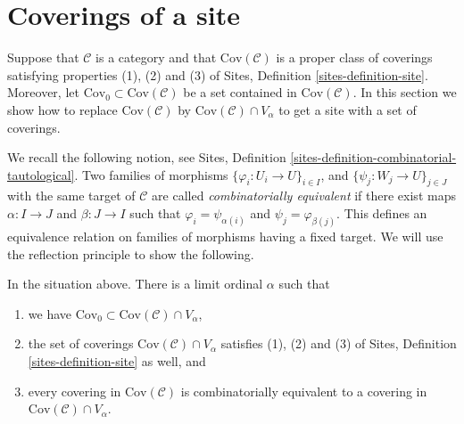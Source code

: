 \section{Coverings of a site}
\label{section-coverings-site}

\noindent
Suppose that $\mathcal{C}$ is a category and
that $\text{Cov}(\mathcal{C})$ is a proper class of coverings
satisfying properties (1), (2) and (3) of Sites,
Definition \ref{sites-definition-site}.
Moreover, let $\text{Cov}_0 \subset \text{Cov}(\mathcal{C})$
be a set contained in $\text{Cov}(\mathcal{C})$.
In this section we show how to replace $\text{Cov}(\mathcal{C})$
by $\text{Cov}(\mathcal{C}) \cap V_\alpha$ to get a site
with a set of coverings.

\medskip\noindent
We recall the following notion, see Sites, Definition
\ref{sites-definition-combinatorial-tautological}.
Two families of morphisms $\{\varphi_i : U_i \to U\}_{i\in I}$, and
$\{\psi_j : W_j \to U\}_{j\in J}$ with the same target of $\mathcal{C}$ are
called {\it combinatorially equivalent} if there exist maps
$\alpha : I \to J$ and $\beta : J\to I$ such that
$\varphi_i = \psi_{\alpha(i)}$ and $\psi_j = \varphi_{\beta(j)}$.
This defines an equivalence relation on families of morphisms
having a fixed target.
We will use the reflection principle to show the following.

\begin{lemma}
\label{lemma-coverings-site}
In the situation above. There is a limit ordinal $\alpha$ such that
\begin{enumerate}
\item we have $\text{Cov}_0 \subset \text{Cov}(\mathcal{C}) \cap V_\alpha$,
\item the set of coverings
$\text{Cov}(\mathcal{C}) \cap V_\alpha$ satisfies
(1), (2) and (3) of Sites, Definition \ref{sites-definition-site}
as well, and
\item every covering in $\text{Cov}(\mathcal{C})$
is combinatorially equivalent
to a covering in $\text{Cov}(\mathcal{C}) \cap V_\alpha$.
\end{enumerate}
\end{lemma}


